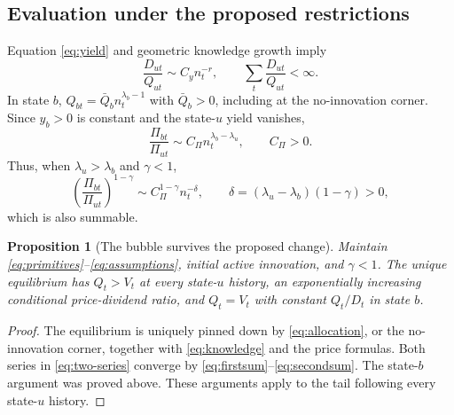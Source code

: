 \documentclass[11pt,a4paper]{article}
\newtheorem{proposition}{Proposition}
\newcommand{\asym}{\sim}
\begin{document}
\subsection{Evaluation under the proposed restrictions}
Equation \eqref{eq:yield} and geometric knowledge growth imply
\begin{equation}
\frac{D_{ut}}{Q_{ut}}\asym C_y n_t^{-r},\qquad
\sum_t\frac{D_{ut}}{Q_{ut}}<\infty.\label{eq:firstsum}
\end{equation}
In state $b$, $Q_{bt}=\bar Q_b n_t^{\lambda_b-1}$ with $\bar Q_b>0$,
including at the no-innovation corner. Since $y_b>0$ is constant and the
state-$u$ yield vanishes,
\begin{equation}
\frac{\Pi_{bt}}{\Pi_{ut}}
\asym C_\Pi n_t^{\lambda_b-\lambda_u},\qquad C_\Pi>0.\label{eq:payoffratio}
\end{equation}
Thus, when $\lambda_u>\lambda_b$ and $\gamma<1$,
\begin{equation}
\left(\frac{\Pi_{bt}}{\Pi_{ut}}\right)^{1-\gamma}
\asym C_\Pi^{1-\gamma}n_t^{-\delta},\qquad
\delta=(\lambda_u-\lambda_b)(1-\gamma)>0,\label{eq:secondsum}
\end{equation}
which is also summable.

\begin{proposition}[The bubble survives the proposed change]
Maintain \eqref{eq:primitives}--\eqref{eq:assumptions}, initial active innovation,
and $\gamma<1$. The unique equilibrium has $Q_t>V_t$ at every state-$u$
history, an exponentially increasing conditional price-dividend ratio, and
$Q_t=V_t$ with constant $Q_t/D_t$ in state $b$.
\end{proposition}
\begin{proof}
The equilibrium is uniquely pinned down by \eqref{eq:allocation}, or the
no-innovation corner, together with \eqref{eq:knowledge} and the price
formulas. Both series in \eqref{eq:two-series} converge by
\eqref{eq:firstsum}--\eqref{eq:secondsum}. The state-$b$ argument was proved
above. These arguments apply to the tail following every state-$u$ history.
\end{proof}
\end{document}
